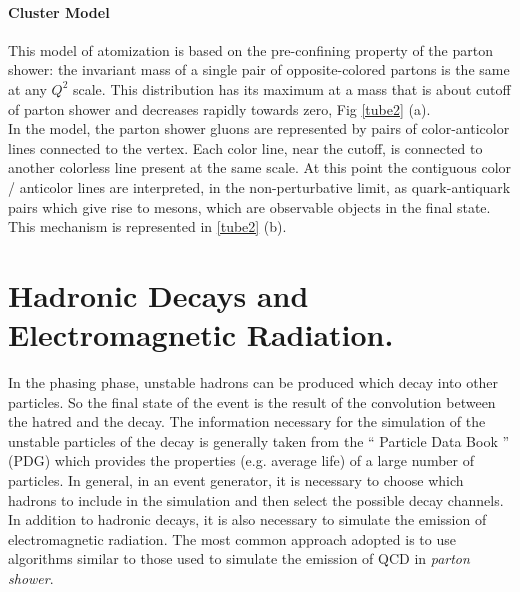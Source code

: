 \paragraph*{Cluster Model}  This model of atomization is based on the pre-confining property of the parton shower: the invariant mass of a single pair of opposite-colored partons is the same at any $ Q^2 $ scale. This distribution has its maximum at a mass that is about cutoff of parton shower and decreases rapidly towards zero, Fig \ref{tube2} (a). \\
In the model, the parton shower gluons are represented by pairs of color-anticolor lines connected to the vertex. Each color line, near the cutoff, is connected to another colorless line present at the same scale. At this point the contiguous color / anticolor lines are interpreted, in the non-perturbative limit, as quark-antiquark pairs which give rise to mesons, which are observable objects in the final state.
This mechanism is represented in \ref{tube2} (b).

\section{Hadronic Decays and  Electromagnetic   Radiation.}
In the phasing phase, unstable hadrons can be produced which decay into other particles. So the final state of the event is the result of the convolution between the hatred and the decay. The information necessary for the simulation of the unstable particles of the decay is generally taken from the `` Particle Data Book '' (PDG) \cite{bib: pdg} which provides the properties (e.g. average life) of a large number of particles.
In general, in an event generator, it is necessary to choose which hadrons to include in the simulation and then select the possible decay channels. In addition to hadronic decays, it is also necessary to simulate the emission of electromagnetic radiation. The most common approach adopted is to use algorithms similar to those used to simulate the emission of QCD in \textit{parton shower}.


